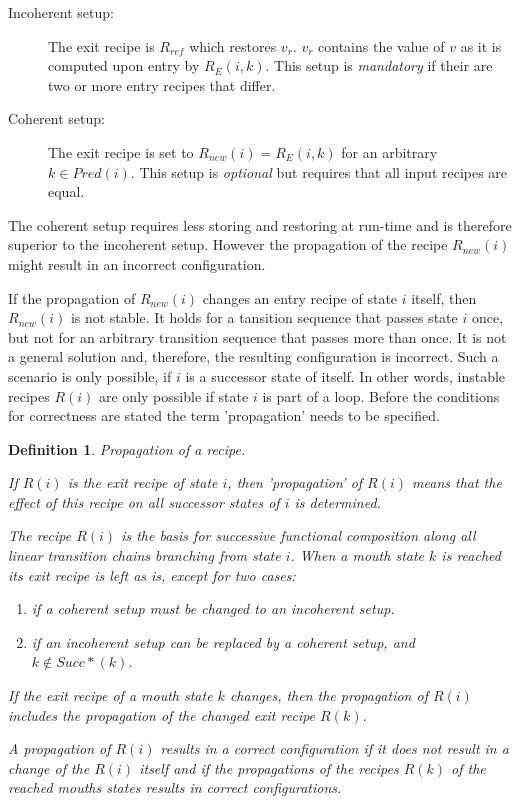\documentclass[12pt,a4paper]{scrartcl}
\newtheorem{definition}{Definition}
\begin{document}
\begin{description}

    \item[Incoherent setup:] The exit recipe is $R_{ref}$ which restores $v_r$.
        $v_r$ contains the value of $v$ as it is computed upon entry by
        $R_E(i,k)$.  This setup is \textit{mandatory} if their are two or more
        entry recipes that differ.

    \item[Coherent setup:] The exit recipe is set to $R_{new}(i)=R_E(i,k)$ for an 
        arbitrary $k\in Pred(i)$. This setup is \textit{optional} but requires that all
        input recipes are equal.
\end{description}

The coherent setup requires less storing and restoring at run-time and is
therefore superior to the incoherent setup.  However the propagation of the recipe
$R_{new}(i)$ might result in an incorrect configuration.

If the propagation of $R_{new}(i)$ changes an entry recipe of state $i$ itself,
then $R_{new}(i)$ is not stable.  It holds for a tansition sequence that passes
state $i$ once, but not for an arbitrary transition sequence that passes more
than once.  It is not a general solution and, therefore, the resulting
configuration is incorrect.  Such a scenario is only possible, if $i$ is a
successor state of itself. In other words, instable recipes $R(i)$ are only
possible if state $i$ is part of a loop. Before the conditions for correctness 
are stated the term 'propagation' needs to be specified.

\begin{definition} Propagation of a recipe.
    
    If $R(i)$ is the exit recipe of state $i$, then 'propagation' of $R(i)$
    means that the effect of this recipe on all successor states of $i$ is 
    determined.

    The recipe $R(i)$ is the basis for successive functional composition along
    all linear transition chains branching from state $i$. When a mouth state
    $k$ is reached its exit recipe is left as is, except for two cases:
    
    \begin{enumerate}
       \item if a coherent setup must be changed to an incoherent setup.
       \item if an incoherent setup can be replaced by a coherent setup, 
             and $k\notin Succ*(k)$.
    \end{enumerate}
    
    If the exit recipe of a  mouth state $k$ changes, then the propagation of
    $R(i)$ includes the propagation of the changed exit recipe $R(k)$.

    A propagation of $R(i)$ results in a correct configuration if it does not
    result in a change of the $R(i)$ itself and if the propagations of the
    recipes $R(k)$ of the reached mouths states results in correct
    configurations.
    
\end{definition}
\end{document}
